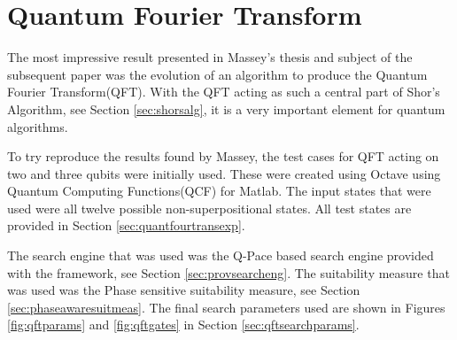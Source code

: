 \section{Quantum Fourier Transform}

The most impressive result presented in Massey's thesis\cite{masseythesis} and subject of the subsequent paper\cite{Massey:2005:EHQ:1068009.1068288Massey:2005:EHQ:1068009.1068288} was the evolution of an algorithm to produce the Quantum Fourier Transform(QFT).
With the QFT acting as such a central part of Shor's Algorithm, see Section \ref{sec:shorsalg}, it is a very important element for quantum algorithms.

To try reproduce the results found by Massey, the test cases for QFT acting on two and three qubits were initially used.
These were created using Octave\cite{octweb} using Quantum Computing Functions(QCF) for Matlab\cite{qcfweb}.
The input states that were used were all twelve possible non-superpositional states.
All test states are provided in Section \ref{sec:quantfourtransexp}.


The search engine that was used was the Q-Pace based search engine provided with the framework, see Section \ref{sec:provsearcheng}.
The suitability measure that was used was the Phase sensitive suitability measure, see Section \ref{sec:phaseawaresuitmeas}.
The final search parameters used are shown in Figures \ref{fig:qftparams} and \ref{fig:qftgates} in Section \ref{sec:qftsearchparams}.










